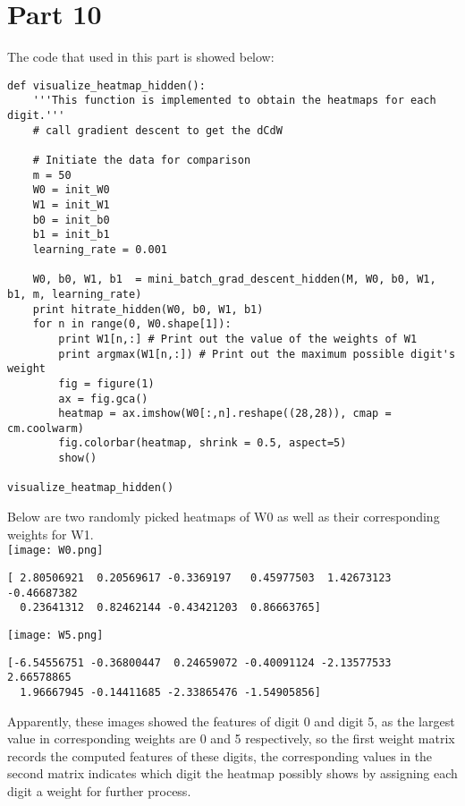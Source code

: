 \documentclass{article}
\begin{document}
\section*{Part 10}
\indent The code that used in this part is showed below:\\
\begin{lstlisting}
def visualize_heatmap_hidden():
    '''This function is implemented to obtain the heatmaps for each digit.'''
    # call gradient descent to get the dCdW

    # Initiate the data for comparison
    m = 50
    W0 = init_W0
    W1 = init_W1
    b0 = init_b0
    b1 = init_b1
    learning_rate = 0.001

    W0, b0, W1, b1  = mini_batch_grad_descent_hidden(M, W0, b0, W1, b1, m, learning_rate)
    print hitrate_hidden(W0, b0, W1, b1)
    for n in range(0, W0.shape[1]):
        print W1[n,:] # Print out the value of the weights of W1
        print argmax(W1[n,:]) # Print out the maximum possible digit's weight
        fig = figure(1)
        ax = fig.gca()    
        heatmap = ax.imshow(W0[:,n].reshape((28,28)), cmap = cm.coolwarm)    
        fig.colorbar(heatmap, shrink = 0.5, aspect=5)
        show()

visualize_heatmap_hidden()
\end{lstlisting}
\indent \indent Below are two randomly picked heatmaps of W0 as well as their corresponding weights for W1.\\
\texttt{[image: W0.png]}
\begin{lstlisting}
[ 2.80506921  0.20569617 -0.3369197   0.45977503  1.42673123 -0.46687382
  0.23641312  0.82462144 -0.43421203  0.86663765]
\end{lstlisting}
\texttt{[image: W5.png]}
\begin{lstlisting}
[-6.54556751 -0.36800447  0.24659072 -0.40091124 -2.13577533  2.66578865
  1.96667945 -0.14411685 -2.33865476 -1.54905856]
\end{lstlisting}
\indent \indent Apparently, these images showed the features of digit 0 and digit 5, as the largest value in corresponding weights are 0 and 5 respectively, so the first weight matrix records the computed features of these digits, the corresponding values in the second matrix indicates which digit the heatmap possibly shows by assigning each digit a weight for further process.
\end{document}
